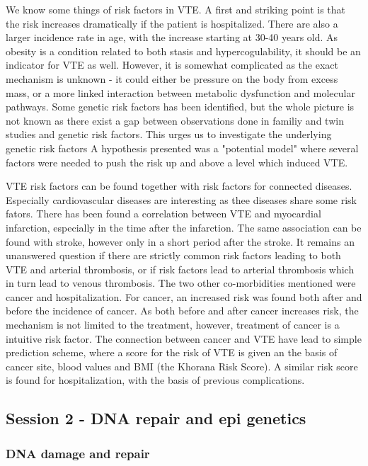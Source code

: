 \documentclass[12p]{article}
\begin{document}
We know some things of risk factors in VTE.
A first and striking point is that the risk increases dramatically if the patient is hospitalized.
There are also a larger incidence rate in age, with the increase starting at 30-40 years old.
As obesity is a condition related to both stasis and hypercogulability, it should be an indicator for VTE as well.
However, it is somewhat complicated as the exact mechanism is unknown - it could either be pressure on the body from excess mass, or a more linked interaction between metabolic dysfunction and molecular pathways.
Some genetic risk factors has been identified, but the whole picture is not known as there exist a gap between observations done in familiy and twin studies and genetic risk factors.
This urges us to investigate the underlying genetic risk factors
A hypothesis presented was a "potential model" where several factors were needed to push the risk up and above a level which induced VTE.

VTE risk factors can be found together with risk factors for connected diseases.
Especially cardiovascular diseases are interesting as thee diseases share some risk fators.
There has been found a correlation between VTE and myocardial infarction, especially in the time after the infarction.
The same association can be found with stroke, however only in a short period after the stroke.
It remains an unanswered question if there are strictly common risk factors leading to both VTE and arterial thrombosis, or if risk factors lead to arterial thrombosis which in turn lead to venous thrombosis.
The two other co-morbidities mentioned were cancer and hospitalization.
For cancer, an increased risk was found both after and before the incidence of cancer.
As both before and after cancer increases risk, the mechanism is not limited to the treatment, however, treatment of cancer is a intuitive risk factor.
The connection between cancer and VTE have lead to simple prediction scheme, where a score for the risk of VTE is given an the basis of cancer site, blood values and BMI (the Khorana Risk Score).
A similar risk score is found for hospitalization, with the basis of previous complications.

\subsection*{Session 2 - DNA repair and epi genetics}

\subsubsection{DNA damage and repair}
\end{document}
